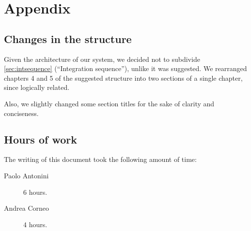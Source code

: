 \chapter{Appendix}\label{chap:appendix}

\section*{Changes in the structure}
Given the architecture of our system, we decided not to subdivide \cref{sec:intsequence} (``Integration sequence''), unlike it was suggested. We rearranged chapters 4 and 5 of the suggested structure into two sections of a single chapter, since logically related.

Also, we slightly changed some section titles for the sake of clarity and conciseness.





\section*{Hours of work}
The writing of this document took the following amount of time:

\begin{description}
	\item [Paolo Antonini] 6 hours.
	\item [Andrea Corneo] 4 hours.
\end{description}



